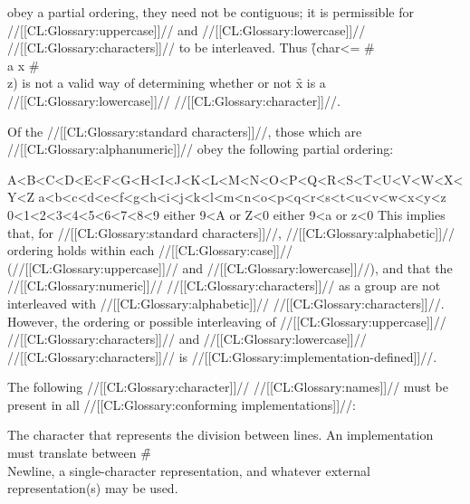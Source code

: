   obey a partial ordering,
  they need not be contiguous; it is permissible for 
  //[[CL:Glossary:uppercase]]// and //[[CL:Glossary:lowercase]]// //[[CL:Glossary:characters]]// to be interleaved. 
  Thus \f{(char<= \#\\a x \#\\z)} 
  is not a valid way of determining whether or not \f{x} is a
  //[[CL:Glossary:lowercase]]// //[[CL:Glossary:character]]//.  


\endlist


Of the //[[CL:Glossary:standard characters]]//,  those which are //[[CL:Glossary:alphanumeric]]// obey the following partial ordering:

\code
 A<B<C<D<E<F<G<H<I<J<K<L<M<N<O<P<Q<R<S<T<U<V<W<X<Y<Z
 a<b<c<d<e<f<g<h<i<j<k<l<m<n<o<p<q<r<s<t<u<v<w<x<y<z
 0<1<2<3<4<5<6<7<8<9
 either 9<A or Z<0
 either 9<a or z<0                                                       \endcode {} This implies that, for //[[CL:Glossary:standard characters]]//, //[[CL:Glossary:alphabetic]]//  ordering holds within each //[[CL:Glossary:case]]// (//[[CL:Glossary:uppercase]]// and //[[CL:Glossary:lowercase]]//),  and that the //[[CL:Glossary:numeric]]// //[[CL:Glossary:characters]]// as a group are not interleaved with //[[CL:Glossary:alphabetic]]// //[[CL:Glossary:characters]]//. However, the ordering or possible interleaving of //[[CL:Glossary:uppercase]]// //[[CL:Glossary:characters]]// and //[[CL:Glossary:lowercase]]// //[[CL:Glossary:characters]]// is //[[CL:Glossary:implementation-defined]]//.

\endsubSection%

 

The following //[[CL:Glossary:character]]// //[[CL:Glossary:names]]// must be present in all  //[[CL:Glossary:conforming implementations]]//:

\beginlist {}

The character that represents the division between lines. An implementation must translate between \f{\#\\Newline},  a single-character representation, and whatever external representation(s) may be used.


